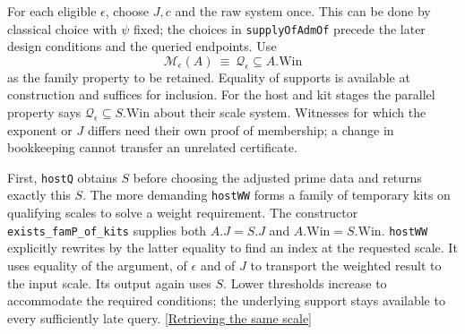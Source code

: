 \documentclass[12pt,letterpaper]{article}
\begin{document}
For each eligible \(\epsilon\), choose \(J,c\) and the raw system once. This can be done by classical choice with \(\psi\) fixed; the choices in \texttt{supplyOfAdmOf} precede the later design conditions and the queried endpoints. Use
\[
           \mathcal M_\epsilon(A)\ \equiv\
                        \mathcal Q_\epsilon\subseteq A.\mathrm{Win}
\]
as the family property to be retained. Equality of supports is available at construction and suffices for inclusion. For the host and kit stages the parallel property says \(\mathcal Q_\epsilon\subseteq S.\mathrm{Win}\) about their scale system. Witnesses for which the exponent or \(J\) differs need their own proof of membership; a change in bookkeeping cannot transfer an unrelated certificate.

First, \texttt{hostQ} obtains \(S\) before choosing the adjusted prime data and returns exactly this \(S\). The more demanding \texttt{hostWW} forms a family of temporary kits on qualifying scales to solve a weight requirement. The constructor \texttt{exists\_famP\_of\_kits} supplies both \(A.J=S.J\) and \(A.\mathrm{Win}=S.\mathrm{Win}\). \texttt{hostWW} explicitly rewrites by the latter equality to find an index at the requested scale. It uses equality of the argument, of \(\epsilon\) and of \(J\) to transport the weighted result to the input scale. Its output again uses \(S\). Lower thresholds increase to accommodate the required conditions; the underlying support stays available to every sufficiently late query.
\href{https://github.com/nousentllc/riemann-hypothesis/blob/40e56bab026552e089d7afcfeff08d2defb9c005/src/Development/AutomorphicArithmetic/CharacterBoxes/HostWW.lean#L73-L87}{[Retrieving the same scale]}
\end{document}
